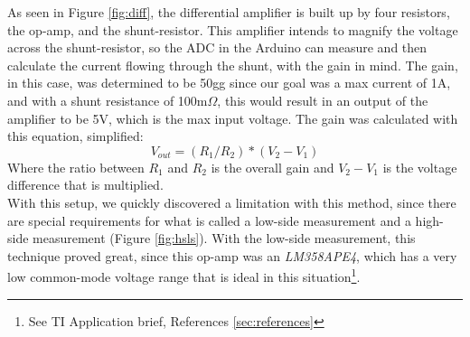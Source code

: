 As seen in Figure \ref{fig:diff}, the differential amplifier is built up by four resistors, the op-amp, and the shunt-resistor. This amplifier intends to magnify the voltage across the shunt-resistor, so the ADC in the Arduino can measure and then calculate the current flowing through the shunt, with the gain in mind.  The gain, in this case, was determined to be 50gg since our goal was a max current of 1A, and with a shunt resistance of 100m$\Omega$, this would result in an output of the amplifier to be 5V, which is the max input voltage. The gain was calculated with this equation, simplified:
\[V_{out}=(R_1/R_2)*(V_2-V_1)\]
Where the ratio between $R_1$ and $R_2$ is the overall gain and $V_2-V_1$ is the voltage difference that is multiplied.
\\
With this setup, we quickly discovered a limitation with this method, since there are special requirements for what is called a low-side measurement and a high-side measurement (Figure \ref{fig:hsls}). With the low-side measurement, this technique proved great, since this op-amp was an \textit{LM358APE4}, which has a very low common-mode voltage range that is ideal in this situation\footnote{See TI Application brief, References \ref{sec:references}}.

